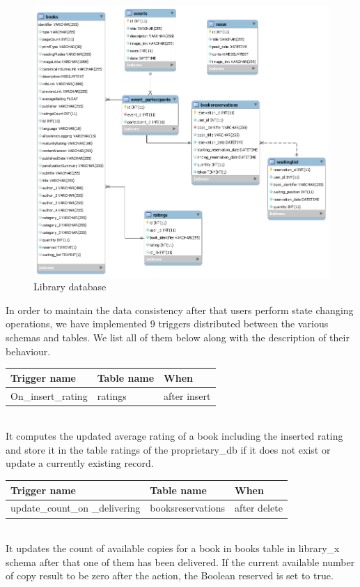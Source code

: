 \vspace*{0cm}
\begin{figure}[H]
	\centering
	\includegraphics[scale=0.50]{Images/Diagrams/library_db_UML}
	\caption{Library database}
\end{figure}

In order to maintain the data consistency after that users perform state changing operations, we have implemented 9 triggers distributed between the various schemas and tables. We list all of them below along with the description of their behaviour.

\newpage
{}

\begin{tabular}[H]{p{4cm}|p{4cm}|p{4cm}}
	\textbf{Trigger name} & \textbf{Table name} & \textbf{When} \\
	\hline
	\rule{0pt}{4ex} On\_insert\_rating  & ratings & after insert \\
	\hline
\end{tabular}
\vspace{0.8cm}
\\
It computes the updated average rating of a book including the inserted rating and store it in the table ratings of the proprietary\_db if it does not exist or update a currently existing record.

\vspace{0.8cm}
\begin{tabular}[H]{p{4cm}|p{4cm}|p{4cm}}
	\textbf{Trigger name} & \textbf{Table name} & \textbf{When} \\
	\hline
	\rule{0pt}{4ex} update\_count\_on
	\_delivering  & booksreservations & after delete \\
	\hline
\end{tabular}
 \vspace{0.8cm}\\
It updates the count of available copies for a book in books table in library\_x schema after that one of them has been delivered. If the current available number of copy result to be zero after the action, the Boolean reserved is set to true.


